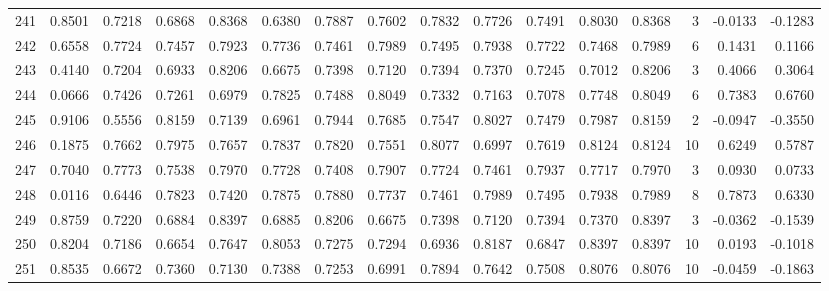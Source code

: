 \begin{tabular}{lrrrrrrrrrrrrrrr}
241 &      0.8501 &  0.7218 &  0.6868 &  0.8368 &  0.6380 &  0.7887 &  0.7602 &  0.7832 &  0.7726 &  0.7491 &   0.8030 &     0.8368 &      3 &                   -0.0133 &                    -0.1283 \\
242 &      0.6558 &  0.7724 &  0.7457 &  0.7923 &  0.7736 &  0.7461 &  0.7989 &  0.7495 &  0.7938 &  0.7722 &   0.7468 &     0.7989 &      6 &                    0.1431 &                     0.1166 \\
243 &      0.4140 &  0.7204 &  0.6933 &  0.8206 &  0.6675 &  0.7398 &  0.7120 &  0.7394 &  0.7370 &  0.7245 &   0.7012 &     0.8206 &      3 &                    0.4066 &                     0.3064 \\
244 &      0.0666 &  0.7426 &  0.7261 &  0.6979 &  0.7825 &  0.7488 &  0.8049 &  0.7332 &  0.7163 &  0.7078 &   0.7748 &     0.8049 &      6 &                    0.7383 &                     0.6760 \\
245 &      0.9106 &  0.5556 &  0.8159 &  0.7139 &  0.6961 &  0.7944 &  0.7685 &  0.7547 &  0.8027 &  0.7479 &   0.7987 &     0.8159 &      2 &                   -0.0947 &                    -0.3550 \\
246 &      0.1875 &  0.7662 &  0.7975 &  0.7657 &  0.7837 &  0.7820 &  0.7551 &  0.8077 &  0.6997 &  0.7619 &   0.8124 &     0.8124 &     10 &                    0.6249 &                     0.5787 \\
247 &      0.7040 &  0.7773 &  0.7538 &  0.7970 &  0.7728 &  0.7408 &  0.7907 &  0.7724 &  0.7461 &  0.7937 &   0.7717 &     0.7970 &      3 &                    0.0930 &                     0.0733 \\
248 &      0.0116 &  0.6446 &  0.7823 &  0.7420 &  0.7875 &  0.7880 &  0.7737 &  0.7461 &  0.7989 &  0.7495 &   0.7938 &     0.7989 &      8 &                    0.7873 &                     0.6330 \\
249 &      0.8759 &  0.7220 &  0.6884 &  0.8397 &  0.6885 &  0.8206 &  0.6675 &  0.7398 &  0.7120 &  0.7394 &   0.7370 &     0.8397 &      3 &                   -0.0362 &                    -0.1539 \\
250 &      0.8204 &  0.7186 &  0.6654 &  0.7647 &  0.8053 &  0.7275 &  0.7294 &  0.6936 &  0.8187 &  0.6847 &   0.8397 &     0.8397 &     10 &                    0.0193 &                    -0.1018 \\
251 &      0.8535 &  0.6672 &  0.7360 &  0.7130 &  0.7388 &  0.7253 &  0.6991 &  0.7894 &  0.7642 &  0.7508 &   0.8076 &     0.8076 &     10 &                   -0.0459 &                    -0.1863 \\

\end{tabular}
